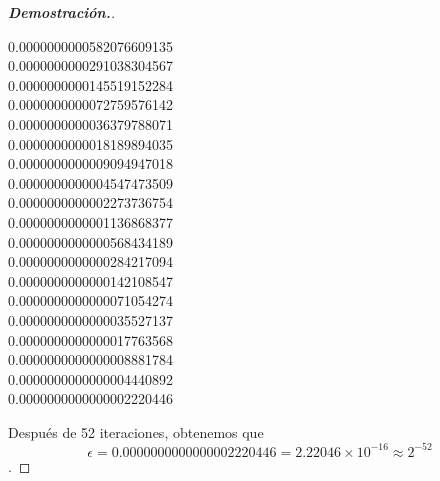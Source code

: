\documentclass{article}
\begin{document}
\begin{enumerate}
\begin{mdframed}[
			      linecolor=darkgray,
			      backgroundcolor=white]
\begin{proof}[\textbf{Demostraci\'on.}]
\begin{center}
				      0.0000000000582076609135\\
				      0.0000000000291038304567\\
				      0.0000000000145519152284\\
				      0.0000000000072759576142\\
				      0.0000000000036379788071\\
				      0.0000000000018189894035\\
				      0.0000000000009094947018\\
				      0.0000000000004547473509\\
				      0.0000000000002273736754\\
				      0.0000000000001136868377\\
				      0.0000000000000568434189\\
				      0.0000000000000284217094\\
				      0.0000000000000142108547\\
				      0.0000000000000071054274\\
				      0.0000000000000035527137\\
				      0.0000000000000017763568\\
				      0.0000000000000008881784\\
				      0.0000000000000004440892\\
				      0.0000000000000002220446\\

			      \end{center}

			      Despu\'es de 52 iteraciones, obtenemos que $$\epsilon = 0.0000000000000002220446 = 2.22046\times10^{-16} \approx 2^{-52}$$.
			      
		      \end{proof}
	      \end{mdframed}

\end{enumerate}
\end{document}
